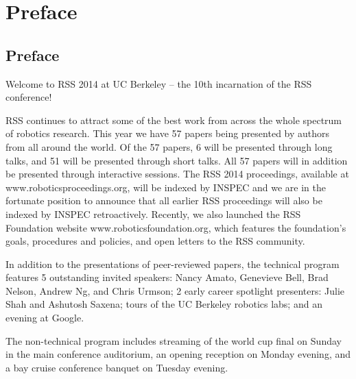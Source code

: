 
\chapter*{Preface}


                                                                     
                                             
\vspace{3cm}
\section*{Preface}
\begingroup{}
\Large
\vspace{1cm}

Welcome to RSS 2014 at UC Berkeley – the 10th incarnation of the RSS conference!

\vspace{1mm}

RSS continues to attract some of the best work from across the whole spectrum of robotics research. This year we have 57 papers being presented by authors from all around the world. Of the 57 papers, 6 will be presented through long talks, and 51 will be presented through short talks. All 57 papers will in addition be presented through interactive sessions. The RSS 2014 proceedings, available at www.roboticsproceedings.org, will be indexed by INSPEC and we are in the fortunate position to announce that all earlier RSS proceedings will also be indexed by INSPEC retroactively. Recently, we also launched the RSS Foundation website www.roboticsfoundation.org, which features the foundation's goals, procedures and policies, and open letters to the RSS community.

\vspace{1mm}

In addition to the presentations of peer-reviewed papers, the technical program features 5 outstanding invited speakers: Nancy Amato, Genevieve Bell, Brad Nelson, Andrew Ng, and Chris Urmson; 2 early career spotlight presenters: Julie Shah and Ashutosh Saxena; tours of the UC Berkeley robotics labs; and an evening at Google.

\vspace{1mm}

The non-technical program includes streaming of the world cup final on Sunday in the main conference auditorium, an opening reception on Monday evening, and a bay cruise conference banquet on Tuesday evening.

